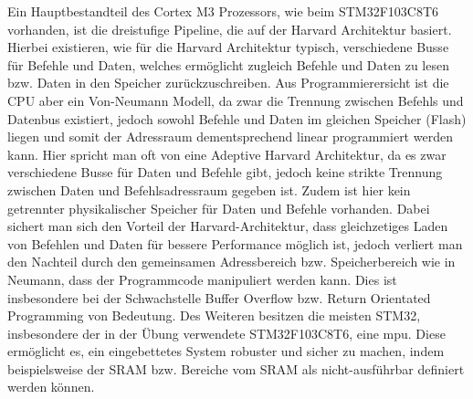 \documentclass[a4paper,
DIV=13,
12pt,
BCOR=10mm,
department=FakIM,
oneside,
parskip=half,
automark,
listof=totocnumbered,
bibliography=totocnumbered,
acronym=totocnumbered
] {OTHRartcl}
\begin{document}
Ein Hauptbestandteil des Cortex M3 Prozessors, wie beim STM32F103C8T6 vorhanden, ist die dreistufige Pipeline, die auf der Harvard Architektur basiert.
Hierbei existieren, wie für die Harvard Architektur typisch, verschiedene Busse für Befehle und Daten, welches ermöglicht zugleich Befehle und Daten zu lesen bzw. Daten in den Speicher zurückzuschreiben.
Aus Programmierersicht ist die CPU aber ein Von-Neumann Modell, da zwar die Trennung zwischen Befehls und Datenbus existiert, jedoch sowohl Befehle und Daten im gleichen Speicher (Flash) liegen und
somit der Adressraum dementsprechend linear programmiert werden kann.
Hier spricht man oft von eine Adeptive Harvard Architektur, da es zwar verschiedene Busse für Daten und Befehle gibt, jedoch keine strikte Trennung zwischen Daten und Befehlsadressraum gegeben ist.
Zudem ist hier kein getrennter physikalischer Speicher für Daten und Befehle vorhanden.
Dabei sichert man sich den Vorteil der Harvard-Architektur, dass gleichzetiges Laden von Befehlen und Daten für bessere Performance möglich ist, jedoch
verliert man den Nachteil durch den gemeinsamen Adressbereich bzw. Speicherbereich wie in Neumann, dass der Programmcode manipuliert werden kann.
Dies ist insbesondere bei der Schwachstelle Buffer Overflow bzw. Return Orientated Programming von Bedeutung.
Des Weiteren besitzen die meisten STM32, insbesondere der in der Übung verwendete STM32F103C8T6, eine \ac{mpu}.
Diese ermöglicht es, ein eingebettetes System robuster und sicher zu machen, indem beispielsweise der SRAM bzw. Bereiche vom SRAM als nicht-ausführbar definiert werden können.

\end{document}
